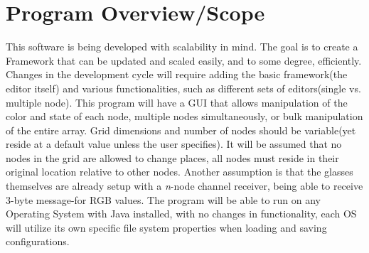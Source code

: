 \documentclass[12pt]{article}
\begin{document}
	\section{Program Overview/Scope}
  	This software is being developed with scalability in mind. The goal is to create a Framework that can be updated and scaled easily, and to some degree, efficiently. Changes in the development cycle will require adding the basic framework(the editor itself) and various functionalities, such as different sets of editors(single vs. multiple node). This program will have a GUI that allows manipulation of the color and state of each node, multiple nodes simultaneously, or bulk manipulation of the entire array. Grid dimensions and number of nodes should be variable(yet reside at a default value unless the user specifies). It will be assumed that no nodes in the grid are allowed to change places, all nodes must reside in their original location relative to other nodes. Another assumption is that the glasses themselves are already setup with a \textit{n}-node channel receiver, being able to receive $3$-byte message-for RGB values. The program will be able to run on any Operating System with Java installed, with no changes in functionality, each OS will utilize its own specific file system properties when loading and saving configurations.
	
\end{document}
